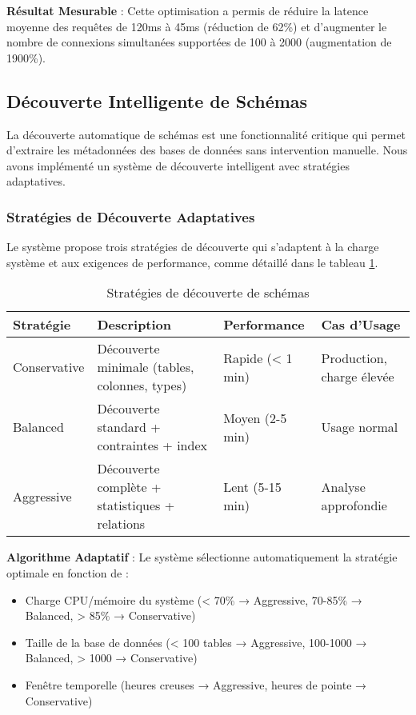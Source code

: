 \textbf{Résultat Mesurable} : Cette optimisation a permis de réduire la latence moyenne des requêtes de 120ms à 45ms (réduction de 62\%) et d'augmenter le nombre de connexions simultanées supportées de 100 à 2000 (augmentation de 1900\%).

\subsection{Découverte Intelligente de Schémas}

La découverte automatique de schémas est une fonctionnalité critique qui permet d'extraire les métadonnées des bases de données sans intervention manuelle. Nous avons implémenté un système de découverte intelligent avec stratégies adaptatives.

\subsubsection{Stratégies de Découverte Adaptatives}

Le système propose trois stratégies de découverte qui s'adaptent à la charge système et aux exigences de performance, comme détaillé dans le tableau \ref{tab:strategies_decouverte}.

\begin{table}[htpb]
\centering
\caption{Stratégies de découverte de schémas}
\label{tab:strategies_decouverte}
\begin{tabular}{|p{}|p{}|p{}|p{}|}
\hline
\textbf{Stratégie} & \textbf{Description} & \textbf{Performance} & \textbf{Cas d'Usage} \\
\hline
Conservative & Découverte minimale (tables, colonnes, types) & Rapide (< 1 min) & Production, charge élevée \\
\hline
Balanced & Découverte standard + contraintes + index & Moyen (2-5 min) & Usage normal \\
\hline
Aggressive & Découverte complète + statistiques + relations & Lent (5-15 min) & Analyse approfondie \\
\hline
\end{tabular}
\end{table}

\textbf{Algorithme Adaptatif} : Le système sélectionne automatiquement la stratégie optimale en fonction de :
\begin{itemize}
    \item Charge CPU/mémoire du système (< 70\% → Aggressive, 70-85\% → Balanced, > 85\% → Conservative)
    \item Taille de la base de données (< 100 tables → Aggressive, 100-1000 → Balanced, > 1000 → Conservative)
    \item Fenêtre temporelle (heures creuses → Aggressive, heures de pointe → Conservative)
\end{itemize}

